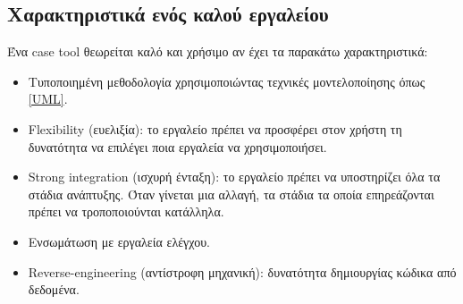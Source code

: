 \subsection{Χαρακτηριστικά ενός καλού εργαλείου}
Ένα case tool θεωρείται καλό και χρήσιμο αν έχει τα παρακάτω χαρακτηριστικά:
\begin{itemize}
	\item Τυποποιημένη μεθοδολογία χρησιμοποιώντας τεχνικές μοντελοποίησης όπως \ref{UML}.
	\item Flexibility (ευελιξία): το εργαλείο πρέπει να προσφέρει στον χρήστη τη δυνατότητα να επιλέγει ποια εργαλεία να χρησιμοποιήσει.
	\item Strong integration (ισχυρή ένταξη): το εργαλείο πρέπει να υποστηρίζει όλα τα στάδια ανάπτυξης. Όταν γίνεται μια αλλαγή, τα στάδια τα οποία επηρεάζονται πρέπει να τροποποιούνται κατάλληλα.
	\item Ενσωμάτωση με εργαλεία ελέγχου.
	\item Reverse-engineering (αντίστροφη μηχανική): δυνατότητα δημιουργίας κώδικα από δεδομένα.
\end{itemize}

	
